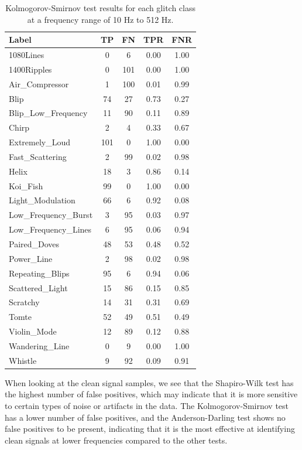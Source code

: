 \documentclass[12pt]{article}
\begin{document}
\begin{table}[H]
  \centering
  \begin{tabular}{lcccc}
  \toprule
  Label & TP & FN & TPR & FNR \\
\midrule
  1080Lines & 0 & 6 & 0.00 & 1.00 \\
  1400Ripples & 0 & 101 & 0.00 & 1.00 \\
  Air\_Compressor & 1 & 100 & 0.01 & 0.99 \\
  Blip & 74 & 27 & 0.73 & 0.27 \\
  Blip\_Low\_Frequency & 11 & 90 & 0.11 & 0.89 \\
  Chirp & 2 & 4 & 0.33  & 0.67 \\
  Extremely\_Loud & 101 & 0 & 1.00 & 0.00 \\
  Fast\_Scattering & 2 & 99 & 0.02 & 0.98 \\
  Helix & 18 & 3 & 0.86 & 0.14 \\
  Koi\_Fish & 99 & 0 & 1.00 & 0.00 \\
  Light\_Modulation & 66 & 6 & 0.92 & 0.08 \\
  Low\_Frequency\_Burst & 3 & 95 & 0.03 & 0.97 \\
  Low\_Frequency\_Lines & 6 & 95 & 0.06 & 0.94 \\
  Paired\_Doves & 48 & 53 & 0.48 & 0.52 \\
  Power\_Line & 2 & 98 & 0.02 & 0.98 \\
  Repeating\_Blips & 95 & 6 & 0.94 & 0.06 \\
  Scattered\_Light & 15 & 86 & 0.15 & 0.85 \\
  Scratchy & 14 & 31 & 0.31 & 0.69 \\
  Tomte & 52 & 49 & 0.51 & 0.49 \\
  Violin\_Mode & 12 & 89 & 0.12 & 0.88 \\
  Wandering\_Line & 0 & 9 & 0.00 & 1.00 \\
  Whistle & 9 & 92 & 0.09 & 0.91 \\
  \bottomrule
  \end{tabular}
  \caption{Kolmogorov-Smirnov test results for each glitch class at a frequency range of 10 Hz to 512 Hz.}
  \label{tab:ks_low_frequency_results}
\end{table}

\noindent When looking at the clean signal samples, we see that the Shapiro-Wilk test has the highest number of false positives, which may indicate that it is more sensitive to certain types of noise or artifacts in the data. The Kolmogorov-Smirnov test has a lower number of false positives, and the Anderson-Darling test shows no false positives to be present, indicating that it is the most effective at identifying clean signals at lower frequencies compared to the other tests.
\end{document}
